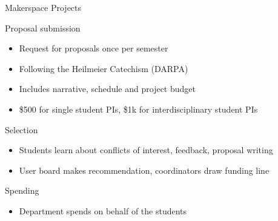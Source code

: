 \documentclass[xcolor={dvipsnames},professionalfonts]{beamer}
\begin{document}

\begin{frame}{Makerspace Projects}
 \begin{block}{Proposal submission}
  \begin{itemize}
   \item Request for proposals once per semester
   \item Following the Heilmeier Catechism (DARPA)
   \item Includes narrative, schedule and project budget
   \item \$500 for single student PIs, \$1k for interdisciplinary student PIs
  \end{itemize}
 \end{block}
 \begin{block}{Selection}
  \begin{itemize}
   \item Students learn about conflicts of interest, feedback, proposal writing
   \item User board makes recommendation, coordinators draw funding line
  \end{itemize}
 \end{block}
 \begin{block}{Spending}
  \begin{itemize}
   \item Department spends on behalf of the students
  \end{itemize}
 \end{block}
\end{frame}

\end{document}
